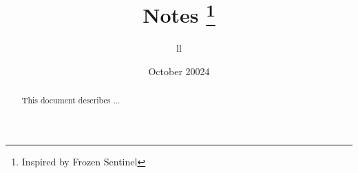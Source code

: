 \documentclass[notoc]{tufte-handout}
\title{Notes \thanks{Inspired by Frozen Sentinel}}
\author{ll}
\date{October 20024}  %
\numberwithin{equation}{section}
\begin{document}
\maketitle%


\begin{abstract}
\noindent This document describes ...
\end{abstract}

\tableofcontents







\newpage







\end{document}
